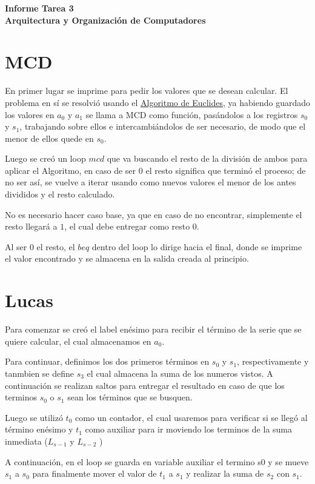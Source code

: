 \documentclass[11pt,letterpaper]{article}
\newcommand{\titulo}{Informe Tarea 3 \\ Arquitectura y Organización de Computadores}
\renewcommand{\maketitle}
{
\thispagestyle{fancy}
\begin{center}
\begin{Large}
\textbf{\titulo}\\
\end{Large}
\end{center}
\vspace{0.3cm}
}
\begin{document}
\setcounter{secnumdepth}{0}
\maketitle
\section{MCD}
En primer lugar se imprime para pedir los valores que se desean calcular. El problema en sí se resolvió usando el \href{https://es.wikipedia.org/wiki/Algoritmo_de_Euclides#Algoritmo_de_Euclides_tradicional}{Algoritmo de Euclides}, ya habiendo guardado los valores en $a_0$ y $a_1$ se llama a MCD como función, pasándolos a los registros $s_0$ y $s_1$, trabajando sobre ellos e intercambiándolos de ser necesario, de modo que el menor de ellos quede en $s_0$. 

Luego se creó un loop $mcd$ que va buscando el resto de la división de ambos para aplicar el Algoritmo, en caso de ser $0$ el resto significa que terminó el proceso; de no ser así, se vuelve a iterar usando como nuevos valores el menor de los antes divididos y el resto calculado.

No es necesario hacer caso base, ya que en caso de no encontrar, simplemente el resto llegará a $1$, el cual debe entregar como resto $0$.

Al ser $0$ el resto, el $beq$ dentro del loop lo dirige hacia el final, donde se imprime el valor encontrado y se almacena en la salida creada al principio. 

\section{Lucas}
Para comenzar se creó el label enésimo para recibir el término de la serie que se quiere calcular, el cual almacenamos en $a_0$. 

Para continuar, definimos los dos primeros términos en $s_0$ y $s_1$, respectivamente y tanmbien se define $s_3$ el cual almacena la suma de los numeros vistos. A continuación se realizan saltos para entregar el resultado en caso de que los terminos $s_0$ o $s_1$ sean los términos que se busquen.

Luego se utilizó $t_0$ como un contador, el cual usaremos para verificar si se llegó al término enésimo y $t_1$ como auxiliar para ir moviendo los terminos de la suma inmediata ($L_{s-1}$ y $L_{s-2}$  )

A continuación, en el loop se guarda en variable auxiliar el termino s0 y se mueve  $s_1$ a  $s_0$ para finalmente mover el valor de  $t_1$ a  $s_1$ y realizar la suma de  $s_2$ con  $s_1$.
\end{document}
